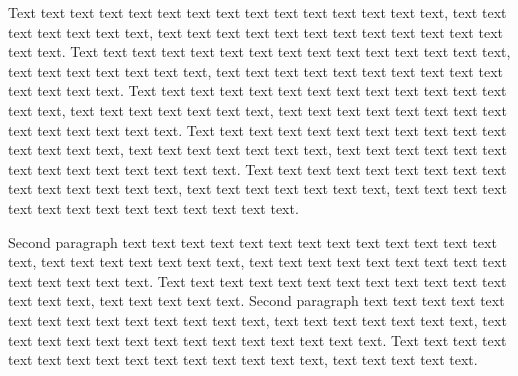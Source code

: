 

\begin{enabstract}
Text text text text text text text text text text text text text text text, text text text text text text text, text text text text text text text text text text text text text text. Text text text text text text text text text text text text text text text, text text text text text text text, text text text text text text text text text text text text text text. Text text text text text text text text text text text text text text text, text text text text text text text, text text text text text text text text text text text text text text. Text text text text text text text text text text text text text text text, text text text text text text text, text text text text text text text text text text text text text text. Text text text text text text text text text text text text text text text, text text text text text text text, text text text text text text text text text text text text text text.

Second paragraph text text text text text text text text text text text text text text, text text text text text text text, text text text text text text text text text text text text text text. Text text text text text text text text text text text text text text text, text text text text text. Second paragraph text text text text text text text text text text text text text text, text text text text text text text, text text text text text text text text text text text text text text. Text text text text text text text text text text text text text text text, text text text text text.
\end{enabstract}
